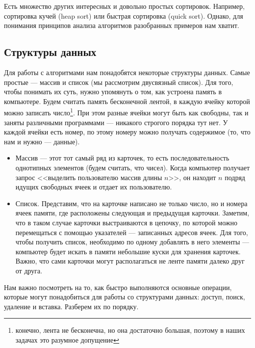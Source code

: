 Есть множество других интересных и довольно простых сортировок. Например, 
сортировка кучей (heap sort) или быстрая сортировка (quick sort). Однако,
для понимания принципов анализа алгоритмов разобранных примеров нам хватит.

\subsection{Структуры данных}

Для работы с алгоритмами нам понадобятся некоторые структуры данных. Самые
простые --- массив и список (мы рассмотрим двусвязный список). Для того, 
чтобы понимать их суть, нужно упомянуть о том, как устроена память в
компьютере. Будем считать память бесконечной лентой, в каждую ячейку которой
можно записать число\footnote{конечно, лента не бесконечна, но она достаточно большая,
поэтому в наших задачах это разумное допущение}. При этом разные ячейки
могут быть как свободны, так и заняты различными программами --- никакого
строгого порядка тут нет. У каждой ячейки есть номер, по этому номеру можно
получать содержимое (то, что нам и нужно --- данные).

\begin{itemize}
    \item Массив --- этот тот самый ряд из карточек, то есть последовательность
        однотипных элементов (будем считать, что чисел). Когда компьютер 
        получает запрос <<выделить пользователю массив длины $n$>>, он находит 
        $n$ подряд идущих свободных ячеек и отдает их пользователю.
    \item Список. Представим, что на карточке написано не только число, но 
        и номера ячеек памяти, где расположены следующая и предыдущая карточки. 
        Заметим, что в таком случае карточки выстраиваются в цепочку, по которой
        можно перемещаться с помощью указателей --- записанных адресов ячеек. 
        Для того, чтобы получить список, необходимо по одному добавлять в него 
        элементы --- компьютер будет искать в памяти небольшие куски для хранения
        карточек. Важно, что сами карточки могут располагаться не ленте памяти 
        далеко друг от друга.
\end{itemize}

Нам важно посмотреть на то, как быстро выполняются основные операции, которые
могут понадобиться для работы со структурами данных: доступ, поиск, удаление
и вставка. Разберем их по порядку.

